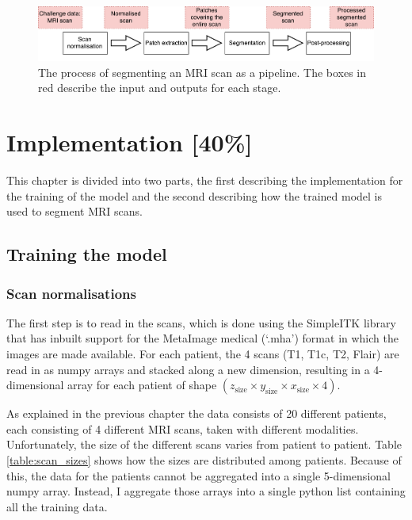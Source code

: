 \documentclass[12pt,a4paper,twoside,openright]{report}
\begin{document}
\begin{figure}
	\centering
	\includegraphics[width=\textwidth]{segmentation_implementation_pipeline}
	\caption[The process of segmenting an MRI scan as a pipeline]{The process of segmenting an MRI scan as a pipeline. The boxes in red describe the input and outputs for each stage.}
	\label{fig:segmentation_implementation_pipeline}
\end{figure}

\chapter{Implementation [40\%]}
This chapter is divided into two parts, the first describing the implementation for the training of the model and the second describing how the trained model is used to segment MRI scans.

\section{Training the model}
\subsection{Scan normalisations}
\label{section:pre-processing}
The first step is to read in the scans, which is done using the SimpleITK library that has inbuilt support for the MetaImage medical (`.mha') format in which the images are made available. For each patient, the 4 scans (T1, T1c, T2, Flair) are read in as numpy arrays and stacked along a new dimension, resulting in a 4-dimensional array for each patient of shape $(z_{\text{size}} \times y_{\text{size}} \times x_{\text{size}} \times 4)$.
 
As explained in the previous chapter the data consists of 20 different patients, each consisting of 4 different MRI scans, taken with different modalities. Unfortunately, the size of the different scans varies from patient to patient. Table \ref{table:scan_sizes} shows how the sizes are distributed among patients. Because of this, the data for the patients cannot be aggregated into a single 5-dimensional numpy array. Instead, I aggregate those arrays into a single python list containing all the training data.
\end{document}
